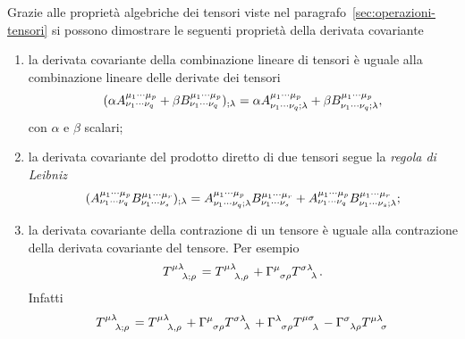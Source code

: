 Grazie alle proprietà algebriche dei tensori viste nel
paragrafo~\ref{sec:operazioni-tensori} si possono dimostrare le seguenti
proprietà della derivata covariante
\begin{enumerate}
\item la derivata covariante della combinazione lineare di tensori è uguale alla
  combinazione lineare delle derivate dei tensori
  \begin{equation}
    (\alpha \tensor*{A}{^{\mu_{1}\cdots\mu_{p}}_{\nu_{1}\cdots\nu_{q}}} + \beta
    \tensor*{B}{^{\mu_{1}\cdots\mu_{p}}_{\nu_{1}\cdots\nu_{q}}})_{;\lambda} =
    \alpha \tensor*{A}{^{\mu_{1}\cdots\mu_{p}}_{\nu_{1}\cdots\nu_{q};\lambda}} +
    \beta \tensor*{B}{^{\mu_{1}\cdots\mu_{p}}_{\nu_{1}\cdots\nu_{q};\lambda}},
  \end{equation}
  con $\alpha$ e $\beta$ scalari;
\item la derivata covariante del prodotto diretto di due
  tensori segue la \emph{regola di Leibniz}
  \begin{equation}
    (\tensor*{A}{^{\mu_{1}\cdots\mu_{p}}_{\nu_{1}\cdots\nu_{q}}}
    \tensor*{B}{^{\mu_{1}\cdots\mu_{r}}_{\nu_{1}\cdots\nu_{s}}})_{;\lambda} =
    \tensor*{A}{^{\mu_{1}\cdots\mu_{p}}_{\nu_{1}\cdots\nu_{q};\lambda}}
    \tensor*{B}{^{\mu_{1}\cdots\mu_{r}}_{\nu_{1}\cdots\nu_{s}}} +
    \tensor*{A}{^{\mu_{1}\cdots\mu_{p}}_{\nu_{1}\cdots\nu_{q}}}
    \tensor*{B}{^{\mu_{1}\cdots\mu_{r}}_{\nu_{1}\cdots\nu_{s};\lambda}};
  \end{equation}
\item la derivata covariante della contrazione
  di un tensore è uguale alla contrazione della derivata covariante del
  tensore.  Per esempio
  \begin{equation}
    \tensor{T}{^{\mu\lambda}_{\lambda;\rho}} =
    \tensor{T}{^{\mu\lambda}_{\lambda,\rho}} +
    \tensor{\Gamma}{^{\mu}_{\sigma\rho}}\tensor{T}{^{\sigma\lambda}_{\lambda}}.
  \end{equation}
  Infatti
  \begin{equation}
    \begin{split}
      \tensor{T}{^{\mu\lambda}_{\lambda;\rho}} &=
      \tensor{T}{^{\mu\lambda}_{\lambda,\rho}} +
      \tensor{\Gamma}{^{\mu}_{\sigma\rho}}\tensor{T}{^{\sigma\lambda}_{\lambda}}
      + \tensor{\Gamma}{^{\lambda}_{\sigma\rho}}
      \tensor{T}{^{\mu\sigma}_{\lambda}} -
      \tensor{\Gamma}{^{\sigma}_{\lambda\rho}}
      \tensor{T}{^{\mu\lambda}_{\sigma}} \\

\end{split}
\end{equation}
\end{enumerate}

